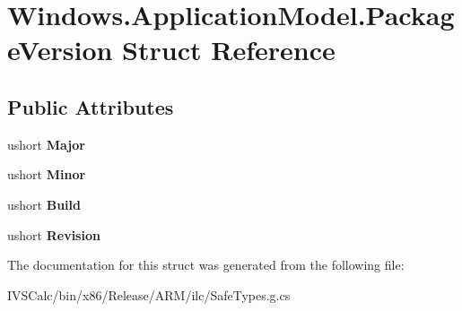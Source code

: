 \hypertarget{struct_windows_1_1_application_model_1_1_package_version}{}\section{Windows.\+Application\+Model.\+Package\+Version Struct Reference}
\label{struct_windows_1_1_application_model_1_1_package_version}
\subsection*{Public Attributes}
\begin{DoxyCompactItemize}
\item 
\mbox{\label{struct_windows_1_1_application_model_1_1_package_version_af176c6e86edff891037ac9e853588936}} 
ushort {\bfseries Major}
\item 
\mbox{\label{struct_windows_1_1_application_model_1_1_package_version_a3675b4339c8b4cb689e0c7a60b63ebc4}} 
ushort {\bfseries Minor}
\item 
\mbox{\label{struct_windows_1_1_application_model_1_1_package_version_ac5e62c6c4c4ba4650ea520a5583acb7d}} 
ushort {\bfseries Build}
\item 
\mbox{\label{struct_windows_1_1_application_model_1_1_package_version_a38c83f332bc6c166d8d9e62ce1ea68fb}} 
ushort {\bfseries Revision}
\end{DoxyCompactItemize}


The documentation for this struct was generated from the following file\+:\begin{DoxyCompactItemize}
\item 
I\+V\+S\+Calc/bin/x86/\+Release/\+A\+R\+M/ilc/Safe\+Types.\+g.\+cs\end{DoxyCompactItemize}
